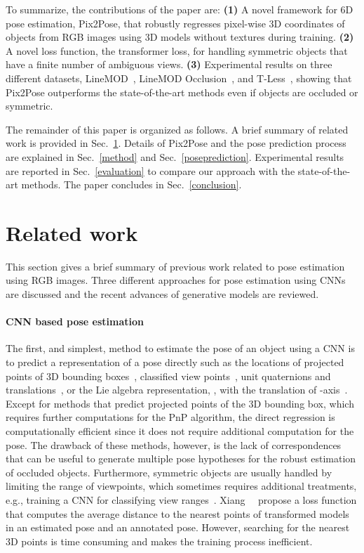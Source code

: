 \documentclass[10pt,twocolumn,letterpaper]{article}
\begin{document}
 
 To summarize, the contributions of the paper are: 
\textbf{(1)} A novel framework for 6D pose estimation, Pix2Pose, that robustly regresses pixel-wise 3D coordinates of objects from RGB images using 3D models without textures during training. \textbf{(2)} A novel loss function, the transformer loss, for handling symmetric objects that have a finite number of ambiguous views. \textbf{(3)} Experimental results on three different datasets, LineMOD~\cite{linemode_hinterstoisser2012}, LineMOD Occlusion~\cite{brachmann2014learning_occlusion}, and T-Less~\cite{rgbddataset:tless}, showing that Pix2Pose outperforms the state-of-the-art methods even if objects are occluded or symmetric.

The remainder of this paper is organized as follows. A brief summary of related work is provided in Sec.~\ref{relatedworks}. Details of Pix2Pose and the pose prediction process are explained in Sec.~\ref{method} and Sec.~\ref{poseprediction}. Experimental results are reported in Sec.~\ref{evaluation} to compare our approach with the state-of-the-art methods. The paper concludes in Sec.~\ref{conclusion}.

\section{Related work} \label{relatedworks}
This section gives a brief summary of previous work related to pose estimation using RGB images. Three different approaches for pose estimation using CNNs are discussed and the recent advances of generative models are reviewed. 


\paragraph{CNN based pose estimation} The first, and simplest, method to estimate the pose of an object using a CNN is to predict a representation of a pose directly such as the locations of projected points of 3D bounding boxes~\cite{rad2017bb8,Tekin_2018_CVPR}, classified view points~\cite{kehl2017ssd}, unit quaternions and translations~\cite{xiang2017posecnn}, or the Lie algebra representation, , with the translation of -axis~\cite{Do2018LieNetRM}. Except for methods that predict projected points of the 3D bounding box, which requires further computations for the PnP algorithm, the direct regression is computationally efficient since it does not require additional computation for the pose. The drawback of these methods, however, is the lack of correspondences that can be useful to generate multiple pose hypotheses for the robust estimation of occluded objects. Furthermore, symmetric objects are usually handled by limiting the range of viewpoints, which sometimes requires additional treatments, e.g., training a CNN for classifying view ranges~\cite{rad2017bb8}. Xiang~\etal~\cite{xiang2017posecnn} propose a loss function that computes the average distance to the nearest points of transformed models in an estimated pose and an annotated pose. However, searching for the nearest 3D points is time consuming and makes the training process inefficient. 
\end{document}
